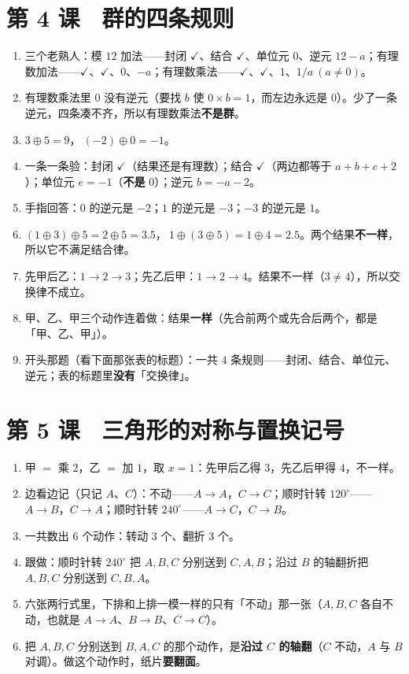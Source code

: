 \section*{第 4 课　群的四条规则}
\begin{enumerate}
  \item 三个老熟人：模 \(12\) 加法——封闭 \(\checkmark\)、结合 \(\checkmark\)、单位元 \(0\)、逆元 \(12-a\)；有理数加法——\(\checkmark\)、\(\checkmark\)、\(0\)、\(-a\)；有理数乘法——\(\checkmark\)、\(\checkmark\)、\(1\)、\(1/a\ (a\neq0)\)。
  \item 有理数乘法里 \(0\) 没有逆元（要找 \(b\) 使 \(0\times b=1\)，而左边永远是 \(0\)）。少了一条逆元，四条凑不齐，所以有理数乘法\textbf{不是群}。
  \item \(3\oplus5=9\)，\(\ (-2)\oplus0=-1\)。
  \item 一条一条验：封闭 \(\checkmark\)（结果还是有理数）；结合 \(\checkmark\)（两边都等于 \(a+b+c+2\)）；单位元 \(e=-1\)（\textbf{不是} \(0\)）；逆元 \(b=-a-2\)。
  \item 手指回答：\(0\) 的逆元是 \(-2\)；\(1\) 的逆元是 \(-3\)；\(-3\) 的逆元是 \(1\)。
  \item \((1\oplus3)\oplus5=2\oplus5=3.5\)，\(\ 1\oplus(3\oplus5)=1\oplus4=2.5\)。两个结果\textbf{不一样}，所以它不满足结合律。
  \item 先甲后乙：\(1\to2\to3\)；先乙后甲：\(1\to2\to4\)。结果不一样（\(3\neq4\)），所以交换律不成立。
  \item 甲、乙、甲三个动作连着做：结果\textbf{一样}（先合前两个或先合后两个，都是「甲、乙、甲」）。
  \item 开头那题（看下面那张表的标题）：一共 \textbf{\(4\)} 条规则——封闭、结合、单位元、逆元；表的标题里\textbf{没有}「交换律」。
\end{enumerate}

\section*{第 5 课　三角形的对称与置换记号}
\begin{enumerate}
  \item 甲 \(=\) 乘 \(2\)，乙 \(=\) 加 \(1\)，取 \(x=1\)：先甲后乙得 \(3\)，先乙后甲得 \(4\)，不一样。
  \item 边看边记（只记 \(A\)、\(C\)）：不动——\(A\to A\)，\(C\to C\)；顺时针转 \(120^\circ\)——\(A\to B\)，\(C\to A\)；顺时针转 \(240^\circ\)——\(A\to C\)，\(C\to B\)。
  \item 一共数出 \(6\) 个动作：转动 \(3\) 个、翻折 \(3\) 个。
  \item 跟做：顺时针转 \(240^\circ\) 把 \(A,B,C\) 分别送到 \(C,A,B\)；沿过 \(B\) 的轴翻折把 \(A,B,C\) 分别送到 \(C,B,A\)。
  \item 六张两行式里，下排和上排一模一样的只有「不动」那一张（\(A,B,C\) 各自不动，也就是 \(A\to A\)、\(B\to B\)、\(C\to C\)）。
  \item 把 \(A,B,C\) 分别送到 \(B,A,C\) 的那个动作，是\textbf{沿过 \(C\) 的轴翻}（\(C\) 不动，\(A\) 与 \(B\) 对调）。做这个动作时，纸片\textbf{要翻面}。
\end{enumerate}


